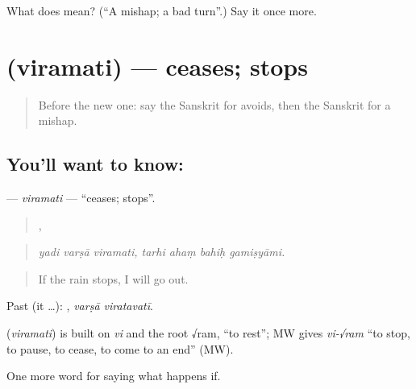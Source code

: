 \begin{tcolorbox}[breakable,colback=teal!4,colframe=teal!35!black,title={Before you move on}]
What does  mean? (\textquotedblleft{}A mishap; a bad turn\textquotedblright{}.) Say it once more.
\end{tcolorbox}
\section[\texorpdfstring{\sk{विरमति} (viramati)}{विरमति (viramati)}]{ (viramati) — ceases; stops}

\label{lesson:SA-C374-viramati}



\begin{quote}
Before the new one: say the Sanskrit for avoids, then the Sanskrit for a mishap.
\end{quote}

\subsection*{You'll want to know: }
\textbf{} — \emph{viramati} — \textquotedblleft{}ceases; stops\textquotedblright{}.

\begin{quote}
  ,    
\end{quote}

\begin{quote}
\emph{yadi varṣā viramati, tarhi ahaṃ bahiḥ gamiṣyāmi.}
\end{quote}

\begin{quote}
If the rain stops, I will go out.
\end{quote}

Past (it …):  , \emph{varṣā viratavatī}.

\begin{cousinweb}
\textbf{} (\emph{viramati}) is built on \emph{vi} and the root √ram, \textquotedblleft{}to rest\textquotedblright{}; MW gives \emph{vi-√ram} \textquotedblleft{}to stop, to pause, to cease, to come to an end\textquotedblright{} (MW).
\end{cousinweb}

\begin{grammarlens}[title={What you've built}]
One more word for saying what happens if.
\end{grammarlens}

